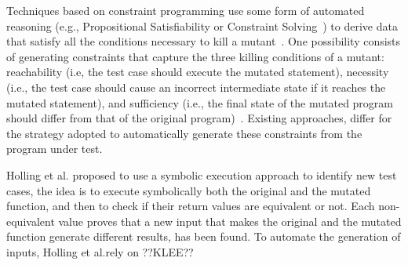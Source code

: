 Techniques based on 
constraint programming use some form of automated reasoning (e.g., Propositional Satisfiability or Constraint Solving~\cite{SATandCPsurvey:2006})
to derive data that satisfy all the conditions necessary to kill a mutant~\cite{offutt1997automatically}.
One possibility consists of generating constraints that capture the three killing conditions of a mutant: reachability (i.e, the test case should execute the mutated statement), necessity (i.e., the test case should cause an incorrect intermediate state if it reaches the mutated statement), and sufficiency (i.e., the final state of the mutated program should differ from that of the original program)~\cite{offutt1997automatically}. Existing approaches, differ for the strategy adopted to automatically generate these constraints from the program under test.


Holling et al. \cite{holling2016nequivack} proposed to use a symbolic execution approach to identify new test cases, the idea is to execute symbolically both the original and the mutated function, and then to check if their return values are equivalent or not. 
Each non-equivalent value proves that a new input that makes the original and the mutated function generate different results, has been found. 
To automate the generation of inputs, Holling et al.rely on ??KLEE??

